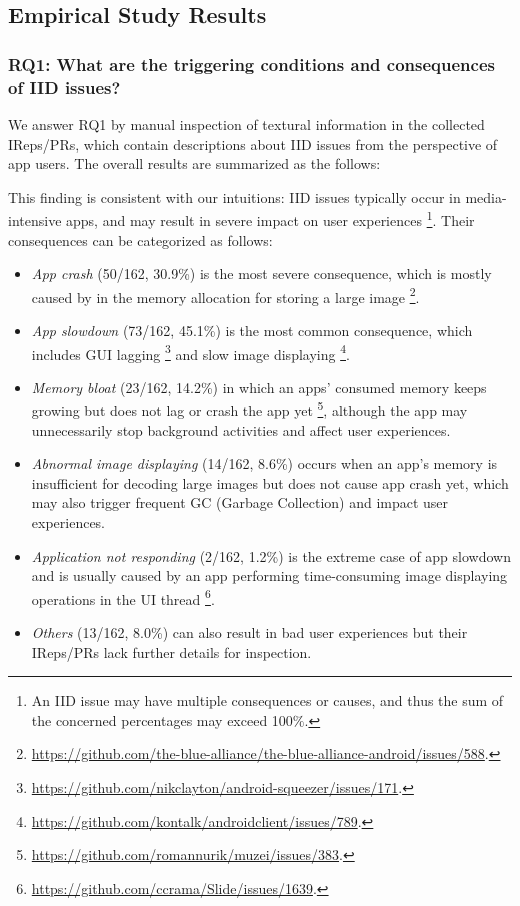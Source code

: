 \subsection{Empirical Study Results}

\subsubsection{RQ1: What are the triggering conditions and consequences of IID issues?}

We answer RQ1 by manual inspection of textural information in the collected IReps/PRs,
which contain descriptions about IID issues from the perspective of app users.
The overall results are summarized as the follows:


This finding is consistent with our intuitions:
IID issues typically occur in media-intensive apps,
and may result in severe impact on user experiences%
\footnote{An IID issue may have multiple consequences or causes, and thus the sum of the concerned percentages may exceed 100$\%$.}.
Their consequences can be categorized as follows:

\begin{itemize}
	\item \emph{App crash} (50/162, 30.9\%) is the most severe consequence, which is mostly caused by  in the memory allocation for storing a large image%
\footnote{\url{https://github.com/the-blue-alliance/the-blue-alliance-android/issues/588}.}.
	\item \emph{App slowdown} (73/162, 45.1\%) is the most common consequence, which includes GUI lagging%
\footnote{\url{https://github.com/nikclayton/android-squeezer/issues/171}.} and slow image displaying%
\footnote{\url{https://github.com/kontalk/androidclient/issues/789}.}. 
	\item \emph{Memory bloat} (23/162, 14.2\%) in which an apps' consumed memory keeps growing but does not lag or crash the app yet%
\footnote{\url{https://github.com/romannurik/muzei/issues/383}.}, although the app may unnecessarily stop background activities and affect user experiences.
	\item \emph{Abnormal image displaying} (14/162, 8.6\%) occurs when an app's memory is insufficient for decoding large images but does not cause app crash yet, which may also trigger frequent GC (Garbage Collection) and impact user experiences.
  \item \emph{Application not responding} (2/162, 1.2\%) is the extreme case of app slowdown and is usually caused by an app performing time-consuming image displaying operations in the UI thread%
\footnote{\url{https://github.com/ccrama/Slide/issues/1639}.}.
	\item \emph{Others} (13/162, 8.0\%) can also result in bad user experiences but their IReps/PRs lack further details for inspection.
\end{itemize}

